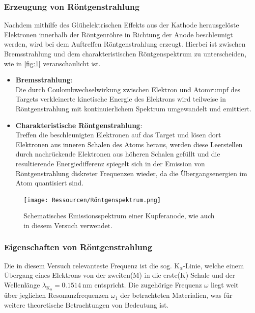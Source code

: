 \documentclass[12pt]{article}
\begin{document}
\subsubsection{Erzeugung von Röntgenstrahlung}
Nachdem mithilfe des Glühelektrischen Effekts aus der Kathode herausgelöste Elektronen innerhalb der Röntgenröhre in Richtung der Anode beschleunigt werden, wird bei dem Auftreffen Röntgenstrahlung erzeugt.
Hierbei ist zwischen Bremsstrahlung und dem charakteristischen Röntgenspektrum zu unterscheiden, wie in \autoref{fig:1} veranschaulicht ist.
\begin{itemize}
  \item \textbf{Bremsstrahlung}:\\Die durch Coulombwechselwirkung zwischen Elektron und Atomrumpf des Targets verkleinerte kinetische Energie des Elektrons wird teilweise in Röntgenstrahlung mit kontinuierlichem Spektrum umgewandelt und emittiert.
  \item \textbf{Charakteristische Röntgenstrahlung}:\\Treffen die beschleunigten Elektronen auf das Target und lösen dort Elektronen aus inneren Schalen des Atoms heraus, werden diese Leerstellen durch nachrückende Elektronen aus höheren Schalen gefüllt und die resultierende Energiedifferenz spiegelt sich in der Emission von Röntgenstrahlung diskreter Frequenzen wieder, da die Übergangsenergien im Atom quantisiert sind.
\end{itemize}
\begin{figure}[H]
  \centering
  \texttt{[image: Ressourcen/Röntgenspektrum.png]}
  \caption{Schematisches Emissionsspektrum einer Kupferanode, wie auch\\in diesem Versuch verwendet\cite{ROEDresden}.}\label{fig:1}
\end{figure}
\subsubsection{Eigenschaften von Röntgenstrahlung}
Die in diesem Versuch relevanteste Frequenz ist die sog. $\text{K}_\alpha$-Linie, welche einem Übergang eines Elektrons von der zweiten(M) in die erste(K) Schale und der Wellenlänge $\lambda_{\text{K}_\alpha}=\SI{0.1514}{\nano\meter}$ entspricht\cite{ekabs}.
Die zugehörige Frequenz $\omega$ liegt weit über jeglichen Resonanzfrequenzen $\omega_1$ der betrachteten Materialien, was für weitere theoretische Betrachtungen von Bedeutung ist.
\end{document}
